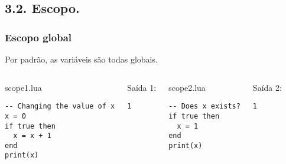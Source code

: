 \documentclass[brazil]{beamer}
\begin{document}
\subsection{3.2. Escopo.}
\begin{frame}[fragile]
  \frametitle{Escopo global}
  \pause
  \begin{center}
    Por padrão, as variáveis são todas globais.
  \end{center}
  \pause
  \begin{columns}
      \begin{block}{scope1.lua}
        \begin{lstlisting}
-- Changing the value of x
x = 0
if true then
  x = x + 1
end
print(x)
        \end{lstlisting}
      \end{block}
      \pause
      \begin{block}{Saída 1:}
        \begin{verbatim}
1 \end{verbatim}
      \end{block}
    \pause
      \begin{block}{scope2.lua}
        \begin{lstlisting}
-- Does x exists?
if true then
  x = 1
end
print(x)
        \end{lstlisting}
      \end{block}
      \pause
      \begin{block}{Saída 2:}
        \begin{verbatim}
1 \end{verbatim}
      \end{block}
  \end{columns}
\end{frame}
\end{document}
